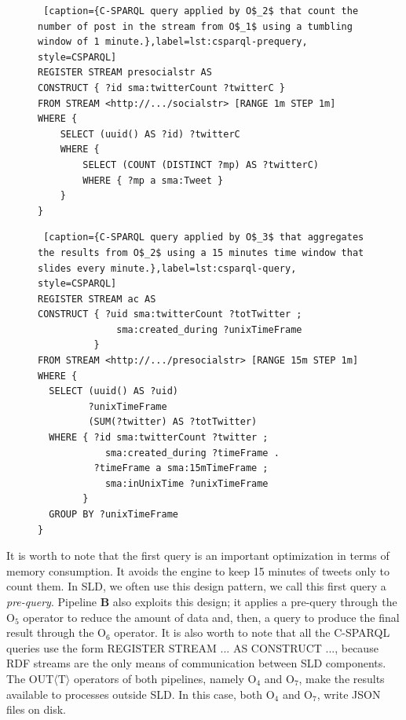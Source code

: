\begin{figure}[ht]
\begin{minipage}{0.95\linewidth}
\begin{lstlisting} [caption={C-SPARQL query applied by O$_2$ that count the number of post in the stream from O$_1$ using a tumbling window of 1 minute.},label=lst:csparql-prequery, style=CSPARQL]
REGISTER STREAM presocialstr AS 
CONSTRUCT { ?id sma:twitterCount ?twitterC } 
FROM STREAM <http://.../socialstr> [RANGE 1m STEP 1m] 
WHERE { 
    SELECT (uuid() AS ?id) ?twitterC 
    WHERE { 
        SELECT (COUNT (DISTINCT ?mp) AS ?twitterC) 
        WHERE { ?mp a sma:Tweet } 
    } 
}
\end{lstlisting}
\end{minipage}
\end{figure}

\begin{figure}[ht]
\begin{minipage}{0.95\linewidth}
\begin{lstlisting} [caption={C-SPARQL query applied by O$_3$ that aggregates the results from O$_2$ using a 15 minutes time window that slides every minute.},label=lst:csparql-query, style=CSPARQL]
REGISTER STREAM ac AS 
CONSTRUCT { ?uid sma:twitterCount ?totTwitter ; 
              sma:created_during ?unixTimeFrame 
          } 
FROM STREAM <http://.../presocialstr> [RANGE 15m STEP 1m] 
WHERE { 
  SELECT (uuid() AS ?uid) 
         ?unixTimeFrame 
         (SUM(?twitter) AS ?totTwitter)
  WHERE { ?id sma:twitterCount ?twitter ; 
            sma:created_during ?timeFrame . 
          ?timeFrame a sma:15mTimeFrame ; 
            sma:inUnixTime ?unixTimeFrame  
        } 
  GROUP BY ?unixTimeFrame 
}
\end{lstlisting}
\end{minipage}
\end{figure}

It is worth to note that the first query is an important optimization in terms of memory consumption. It avoids the engine to keep 15 minutes of tweets only to count them. In SLD, we often use this design pattern, we call this first query a \textit{pre-query}.
Pipeline \textbf{B} also exploits this design; it applies a pre-query through the O$_5$ operator to reduce the amount of data and, then, a query to produce the final result through the O$_6$ operator. 
It is also worth to note that all the C-SPARQL queries use the form REGISTER STREAM ... AS CONSTRUCT ..., because RDF streams are the only means of communication between SLD components.
The OUT$\langle\mathrm{T}\rangle$ operators of both pipelines, namely O$_4$ and O$_7$, make the results available to processes outside SLD. In this case, both O$_4$ and O$_7$, write JSON files on disk.

